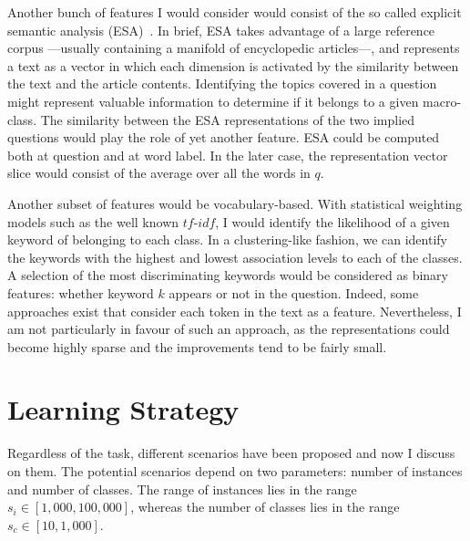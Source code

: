\documentclass{sig-alternate-05-2015}
\begin{document}
Another bunch of features I would consider would consist of the so called 
explicit semantic analysis (ESA)~\cite{Gabrilovich:07}. In brief, ESA takes 
advantage of a large reference corpus ---usually containing a manifold of 
encyclopedic articles---, and represents a text as a vector in which each 
dimension is activated by the similarity between the text and the article 
contents. Identifying the topics covered in a question might represent valuable 
information to determine if it belongs to a given macro-class. The similarity 
between the ESA representations of the two implied questions would play the role 
of yet another feature. ESA could be computed both at question and at word 
label. In the later case, the representation vector slice would consist of the
average over all the words in $q$.

Another subset of features would be vocabulary-based. With statistical weighting 
models such as the well known $tf$-$idf$, I would identify the likelihood of a 
given keyword of belonging to each class. In a clustering-like fashion, we can 
identify the keywords with the highest and lowest association levels to each of 
the classes. A selection of the most discriminating keywords would be considered 
as binary features: whether keyword $k$ appears or not in the question. Indeed, 
some approaches exist that consider each token in the text as a feature. 
Nevertheless, I am not particularly in favour of such an approach, as the 
representations could become highly sparse and the improvements tend to be 
fairly small.




\section{Learning Strategy}
\label{sec:learning}
Regardless of the task, different scenarios have been proposed and now I 
discuss on them. The potential scenarios depend on two parameters: number of 
instances and number of classes. The range of instances lies in the range 
$s_i\in [1,000, 100,000]$, whereas the number of classes lies in the range 
$s_c\in [10,1,000]$. 
\end{document}
